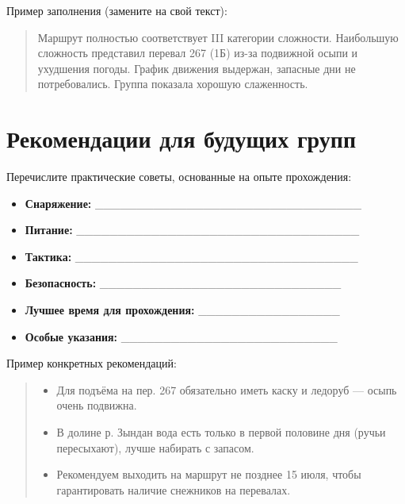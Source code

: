 Пример заполнения (замените на свой текст):
\begin{quote}
Маршрут полностью соответствует III категории сложности. Наибольшую сложность представил перевал 267 (1Б) из-за подвижной осыпи и ухудшения погоды. График движения выдержан, запасные дни не потребовались. Группа показала хорошую слаженность.
\end{quote}


\section{Рекомендации для будущих групп}

Перечислите практические советы, основанные на опыте прохождения:

\begin{itemize}
    \item \textbf{Снаряжение:} \_\_\_\_\_\_\_\_\_\_\_\_\_\_\_\_\_\_\_\_\_\_\_\_\_\_\_\_\_\_\_\_
    \item \textbf{Питание:} \_\_\_\_\_\_\_\_\_\_\_\_\_\_\_\_\_\_\_\_\_\_\_\_\_\_\_\_\_\_\_\_\_\_
    \item \textbf{Тактика:} \_\_\_\_\_\_\_\_\_\_\_\_\_\_\_\_\_\_\_\_\_\_\_\_\_\_\_\_\_\_\_\_\_\_
    \item \textbf{Безопасность:} \_\_\_\_\_\_\_\_\_\_\_\_\_\_\_\_\_\_\_\_\_\_\_\_\_\_\_\_\_
    \item \textbf{Лучшее время для прохождения:} \_\_\_\_\_\_\_\_\_\_\_\_\_\_\_\_\_
    \item \textbf{Особые указания:} \_\_\_\_\_\_\_\_\_\_\_\_\_\_\_\_\_\_\_\_\_\_\_\_\_\_
\end{itemize}

Пример конкретных рекомендаций:
\begin{quote}
\begin{itemize}
    \item Для подъёма на пер. 267 обязательно иметь каску и ледоруб — осыпь очень подвижна.
    \item В долине р. Зындан вода есть только в первой половине дня (ручьи пересыхают), лучше набирать с запасом.
    \item Рекомендуем выходить на маршрут не позднее 15 июля, чтобы гарантировать наличие снежников на перевалах.
\end{itemize}
\end{quote}